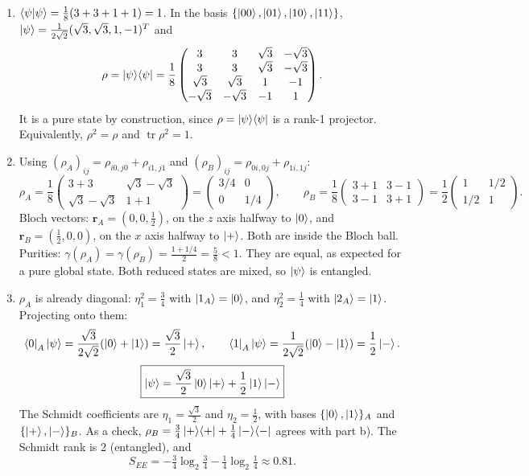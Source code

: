 \documentclass[11pt,a4paper]{article}
\newcommand{\tr}{\operatorname{tr}}
\begin{document}
\begin{enumerate}
\item $\braket{\psi|\psi}=\frac18(3+3+1+1)=1$. In the basis $\{\ket{00},\ket{01},\ket{10},\ket{11}\}$,
$\ket\psi=\frac1{2\sqrt2}(\sqrt3,\sqrt3,1,-1)^T$ and
\[
\rho=\ket\psi\!\bra\psi=\frac18\begin{pmatrix}3&3&\sqrt3&-\sqrt3\\3&3&\sqrt3&-\sqrt3\\\sqrt3&\sqrt3&1&-1\\-\sqrt3&-\sqrt3&-1&1\end{pmatrix}.
\]
It is a pure state by construction, since $\rho=\ket\psi\!\bra\psi$ is a rank-1 projector. Equivalently, $\rho^2=\rho$ and $\tr\rho^2=1$.

\item Using $(\rho_A)_{ij}=\rho_{i0,j0}+\rho_{i1,j1}$ and $(\rho_B)_{ij}=\rho_{0i,0j}+\rho_{1i,1j}$:
\[
\rho_A=\frac18\begin{pmatrix}3+3&\sqrt3-\sqrt3\\\sqrt3-\sqrt3&1+1\end{pmatrix}=\begin{pmatrix}3/4&0\\0&1/4\end{pmatrix},
\qquad
\rho_B=\frac18\begin{pmatrix}3+1&3-1\\3-1&3+1\end{pmatrix}=\frac12\begin{pmatrix}1&1/2\\1/2&1\end{pmatrix}.
\]
Bloch vectors: $\bm r_A=(0,0,\tfrac12)$, on the $z$ axis halfway to $\ket0$, and
$\bm r_B=(\tfrac12,0,0)$, on the $x$ axis halfway to $\ket+$. Both are inside the Bloch ball. Purities:
$\gamma(\rho_A)=\gamma(\rho_B)=\frac{1+1/4}{2}=\frac58<1$. They are equal, as expected for a pure global state. Both
reduced states are mixed, so $\ket\psi$ is entangled.

\item $\rho_A$ is already diagonal: $\eta_1^2=\frac34$ with $\ket{1_A}=\ket0$, and $\eta_2^2=\frac14$ with
$\ket{2_A}=\ket1$. Projecting onto them:
\[
\bra0_A\ket\psi=\frac{\sqrt3}{2\sqrt2}(\ket0+\ket1)=\frac{\sqrt3}{2}\ket+,\qquad
\bra1_A\ket\psi=\frac{1}{2\sqrt2}(\ket0-\ket1)=\frac12\ket- .
\]
\[
\boxed{\ket\psi=\frac{\sqrt3}{2}\ket0\ket++\frac12\ket1\ket-}
\]
The Schmidt coefficients are $\eta_1=\frac{\sqrt3}{2}$ and $\eta_2=\frac12$, with bases
$\{\ket0,\ket1\}_A$ and $\{\ket+,\ket-\}_B$. As a check, $\rho_B=\frac34\ket+\!\bra++\frac14\ket-\!\bra-$
agrees with part b). The Schmidt rank is 2 (entangled), and
\[
S_{EE}=-\tfrac34\log_2\tfrac34-\tfrac14\log_2\tfrac14\approx0.81 .
\]


\end{enumerate}
\end{document}
